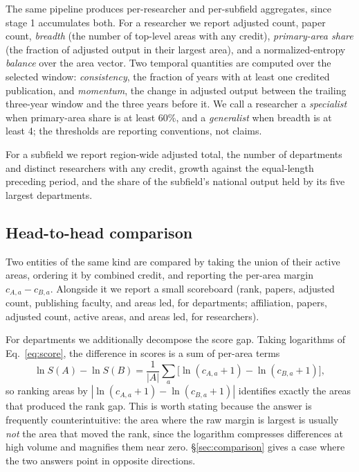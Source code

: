 \documentclass[11pt]{article}
\begin{document}
The same pipeline produces per-researcher and per-subfield aggregates, since
stage 1 accumulates both. For a researcher we report adjusted count, paper
count, \emph{breadth} (the number of top-level areas with any credit),
\emph{primary-area share} (the fraction of adjusted output in their largest
area), and a normalized-entropy \emph{balance} over the area vector. Two
temporal quantities are computed over the selected window: \emph{consistency},
the fraction of years with at least one credited publication, and
\emph{momentum}, the change in adjusted output between the trailing three-year
window and the three years before it. We call a researcher a \emph{specialist}
when primary-area share is at least 60\%, and a \emph{generalist} when breadth
is at least 4; the thresholds are reporting conventions, not claims.

For a subfield we report region-wide adjusted total, the number of departments
and distinct researchers with any credit, growth against the equal-length
preceding period, and the share of the subfield's national output held by its
five largest departments.

\subsection{Head-to-head comparison}
\label{sec:comparemethod}

Two entities of the same kind are compared by taking the union of their active
areas, ordering it by combined credit, and reporting the per-area margin
$c_{A,a} - c_{B,a}$. Alongside it we report a small scoreboard (rank, papers,
adjusted count, publishing faculty, and areas led, for departments; affiliation,
papers, adjusted count, active areas, and areas led, for researchers).

For departments we additionally decompose the score gap. Taking logarithms of
Eq.~\ref{eq:score}, the difference in scores is a sum of per-area terms
\begin{equation}
  \ln S(A) - \ln S(B) = \frac{1}{|A|}\sum_{a} \big[\ln(c_{A,a}+1) - \ln(c_{B,a}+1)\big],
  \label{eq:gap}
\end{equation}
so ranking areas by $|\ln(c_{A,a}+1) - \ln(c_{B,a}+1)|$ identifies exactly the
areas that produced the rank gap. This is worth stating because the answer is
frequently counterintuitive: the area where the raw margin is largest is
usually \emph{not} the area that moved the rank, since the logarithm compresses
differences at high volume and magnifies them near zero.
\S\ref{sec:comparison} gives a case where the two answers point in opposite
directions.
\end{document}
